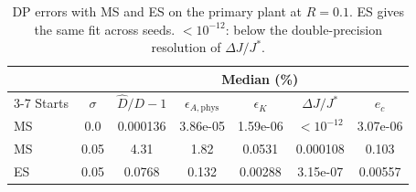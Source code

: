 \begin{table}[!t]
\centering
\footnotesize
\caption{DP errors with MS and ES on the primary plant at $R=0.1$. ES gives the same fit across seeds. $<10^{-12}$: below the double-precision resolution of $\Delta J/J^*$.}
\label{tab:dp-starts}
\setlength{\tabcolsep}{3pt}
\begin{tabular}{lcccccc}
\toprule
 & & \multicolumn{5}{c}{Median (\%)} \\
\cmidrule(lr){3-7}
Starts & $\sigma$ & $\hat D/D-1$ & $\epsilon_{A,\mathrm{phys}}$ & $\epsilon_K$ & $\Delta J/J^*$ & $e_c$ \\
\midrule
MS & 0.0 & 0.000136 & 3.86e-05 & 1.59e-06 & $<10^{-12}$ & 3.07e-06 \\
MS & 0.05 & 4.31 & 1.82 & 0.0531 & 0.000108 & 0.103 \\
ES & 0.05 & 0.0768 & 0.132 & 0.00288 & 3.15e-07 & 0.00557 \\
\bottomrule
\end{tabular}
\end{table}
